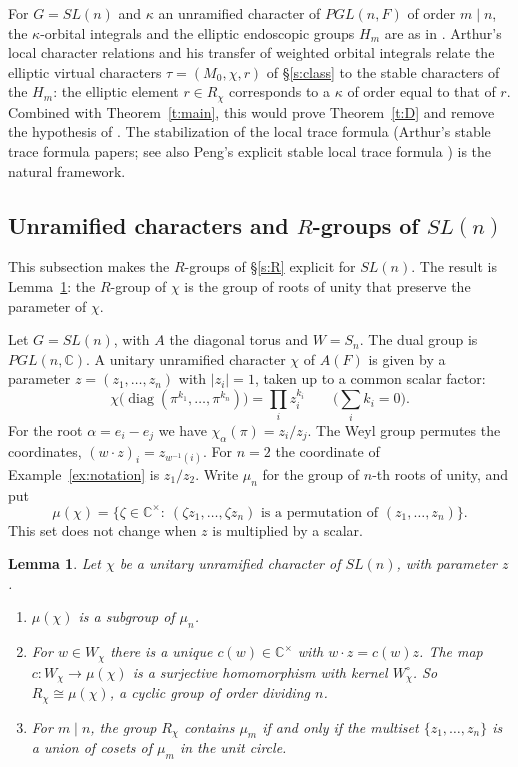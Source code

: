 \documentclass[12pt,letterpaper]{article}
\numberwithin{equation}{section}
\theoremstyle{plain}
\newtheorem{lemma}[theorem]{Lemma}
\theoremstyle{definition}
\theoremstyle{remark}
\DeclareMathOperator{\diag}{diag}
\begin{document}
For $G=SL(n)$ and $\kappa$ an unramified character of $PGL(n,F)$ of order $m\mid n$, the $\kappa$-orbital integrals and the elliptic endoscopic groups $H_m$ are as in \cite[\S5]{JC26}. Arthur's local character relations \cite{Ar96} and his transfer of weighted orbital integrals \cite{Ar99} relate the elliptic virtual characters $\tau=(M_0,\chi,r)$ of \S\ref{s:class} to the stable characters of the $H_m$: the elliptic element $r\in R_\chi$ corresponds to a $\kappa$ of order equal to that of $r$. Combined with Theorem~\ref{t:main}, this would prove Theorem~\ref{t:D} and remove the hypothesis of \cite[Prop.~5.2]{JC26}. The stabilization of the local trace formula (Arthur's stable trace formula papers; see also Peng's explicit stable local trace formula \cite{Pe16}) is the natural framework.

\subsection{Unramified characters and \texorpdfstring{$R$}{R}-groups of \texorpdfstring{$SL(n)$}{SL(n)}}\label{s:slnR}

This subsection makes the $R$-groups of \S\ref{s:R} explicit for $SL(n)$. The result is Lemma~\ref{l:slnR}: the $R$-group of $\chi$ is the group of roots of unity that preserve the parameter of $\chi$.

Let $G=SL(n)$, with $A$ the diagonal torus and $W=S_n$. The dual group is $PGL(n,\mathbb{C})$. A unitary unramified character $\chi$ of $A(F)$ is given by a parameter $z=(z_1,\dots,z_n)$ with $|z_i|=1$, taken up to a common scalar factor:
\[
\chi\big(\diag(\pi^{k_1},\dots,\pi^{k_n})\big)=\prod_iz_i^{k_i}\qquad\Big(\sum_ik_i=0\Big).
\]
For the root $\alpha=e_i-e_j$ we have $\chi_\alpha(\pi)=z_i/z_j$. The Weyl group permutes the coordinates, $(w\cdot z)_i=z_{w^{-1}(i)}$. For $n=2$ the coordinate of Example~\ref{ex:notation} is $z_1/z_2$. Write $\mu_n$ for the group of $n$-th roots of unity, and put
\[
\mu(\chi)=\{\zeta\in\mathbb{C}^\times:\ (\zeta z_1,\dots,\zeta z_n)\text{ is a permutation of }(z_1,\dots,z_n)\}.
\]
This set does not change when $z$ is multiplied by a scalar.

\begin{lemma}\label{l:slnR}
Let $\chi$ be a unitary unramified character of $SL(n)$, with parameter $z$.
\begin{enumerate}[label=(\alph*)]
\item $\mu(\chi)$ is a subgroup of $\mu_n$.
\item For $w\in W_\chi$ there is a unique $c(w)\in\mathbb{C}^\times$ with $w\cdot z=c(w)z$. The map $c:W_\chi\to\mu(\chi)$ is a surjective homomorphism with kernel $W^\circ_\chi$. So $R_\chi\cong\mu(\chi)$, a cyclic group of order dividing $n$.
\item For $m\mid n$, the group $R_\chi$ contains $\mu_m$ if and only if the multiset $\{z_1,\dots,z_n\}$ is a union of cosets of $\mu_m$ in the unit circle.
\end{enumerate}
\end{lemma}
\end{document}
